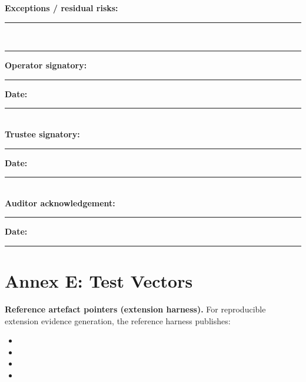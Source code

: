 \documentclass[11pt]{article}
\theoremstyle{definition}
\theoremstyle{plain}
\theoremstyle{remark}
\begin{document}
\textbf{Exceptions / residual risks:} \\
\rule{\linewidth}{0.4pt} \\
\rule{\linewidth}{0.4pt}

\vspace{0.5em}
\textbf{Operator signatory:} \rule{0.48\linewidth}{0.4pt} \hfill \textbf{Date:} \rule{0.18\linewidth}{0.4pt} \\
\textbf{Trustee signatory:} \rule{0.48\linewidth}{0.4pt} \hfill \textbf{Date:} \rule{0.18\linewidth}{0.4pt} \\
\textbf{Auditor acknowledgement:} \rule{0.42\linewidth}{0.4pt} \hfill \textbf{Date:} \rule{0.18\linewidth}{0.4pt}
\endgroup

\section{Annex E: Test Vectors}
\label{ann:test-vectors}

\textbf{Reference artefact pointers (extension harness).}
For reproducible extension evidence generation, the reference harness publishes:
\begin{itemize}[leftmargin=*]
  \item {}
  \item {}
  \item {}
  \item {}
\end{itemize}

\newcommand{\TestVectorCard}[7]{%
\subsection*{Test Identifier: #1}
\textbf{Rationale.} #2
\begin{center}
\small
\setlength{\tabcolsep}{6pt}
\renewcommand{\arraystretch}{1.18}
\begin{tabularx}{0.98\linewidth}{p{0.20\linewidth} Y}
\rowcolor{tableheadgray}
\textbf{Field} & \textbf{Value} \\ \hline
\rowcolor{tablerowgray}
Expectation & #3 \\
Input & #4 \\
\rowcolor{tablerowgray}
Pass set & #5 \\
Fail set & #6 \\
\end{tabularx}
\end{center}
\textbf{Remarks.} #7
}
\end{document}
